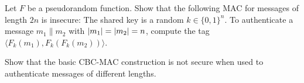 \documentclass[12pt,letterpaper,boxed]{amspset}
\begin{document}

\begin{problem}[4.1]
Let $F$ be a pseudorandom function. Show that the following MAC for messages of length $2n$ is insecure: The shared key is a random $k\in \{0,1\}^n$. To authenticate a message $m_1\| m_2$ with $\lvert m_1\rvert=\lvert m_2\rvert=n$, compute the tag $\langle F_k(m_1), F_k(F_k(m_2))\rangle$. 
\end{problem}

\begin{solution}
\vspace{3cm}
\end{solution}

\begin{problem}[4.2]
Show that the basic CBC-MAC construction is not secure when used to authenticate messages of different lengths.
\end{problem}

\begin{solution}
\vspace{3cm}
\end{solution}






\end{document}
